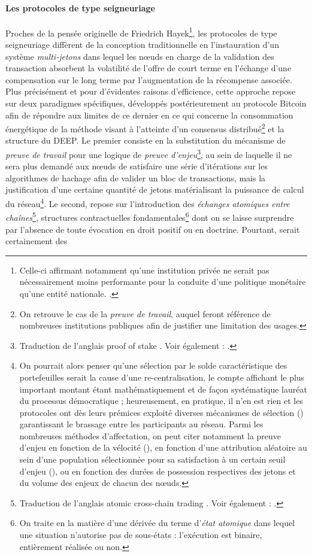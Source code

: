 {\paragraph{Les protocoles de type seigneuriage}

Proches de la pensée originelle de Friedrich Hayek\footnote{Celle-ci affirmant notamment qu'une institution privée ne serait pas nécessairement moins performante pour la conduite d'une politique monétaire qu'une entité nationale. .}, les protocoles de type seigneuriage diffèrent de la conception traditionnelle en l'instauration d'un système \emph{multi-jetons} dans lequel les n\oe{}uds en charge de la validation des transaction absorbent la volatilité de l'offre de court terme en l'échange d'une compensation sur le long terme par l'augmentation de la récompense associée. Plus précisément et pour d'évidentes raisons d'efficience, cette approche repose sur deux paradigmes spécifiques, développés postérieurement au protocole Bitcoin afin de répondre aux limites de ce dernier en ce qui concerne la consommation énergétique de la méthode visant à l'atteinte d'un consensus distribué\footnote{On retrouve le cas de la \emph{preuve de travail}, auquel feront référence de nombreuses institutions publiques afin de justifier une limitation des usages.} et la structure du DEEP. Le premier consiste en la substitution du mécanisme de \emph{preuve de travail} pour une logique de \emph{preuve d'enjeu}\footnote{Traduction de l'anglais \og proof of stake \fg{}. Voir également : .}, au sein de laquelle il ne sera plus demandé aux n\oe{}uds de satisfaire une série d'itérations sur les algorithmes de hachage afin de valider un bloc de transactions, mais la justification d'une certaine quantité de jetons matérialisant la puissance de calcul du réseau\footnote{On pourrait alors penser qu'une sélection par le solde caractéristique des portefeuilles serait la cause d'une re-centralisation, le compte affichant le plus important montant étant mathématiquement et de façon systématique lauréat du processus démocratique ; heureusement, en pratique, il n'en est rien et les protocoles ont dès leurs prémices exploité diverses mécanismes de sélection () garantissant le brassage entre les participants au réseau. Parmi les nombreuses méthodes d'affectation, on peut citer notamment la preuve d'enjeu en fonction de la vélocité (), en fonction d'une attribution aléatoire au sein d'une population sélectionnée pour sa satisfaction à un certain seuil d'enjeu (), ou en fonction des durées de possession respectives des jetons et du volume des enjeux de chacun des n\oe{}uds.}. Le second, repose sur l'introduction des \emph{échanges atomiques entre chaînes}\footnote{Traduction de l'anglais \og atomic cross-chain trading \fg{}. Voir également : .}, structures contractuelles fondamentales\footnote{On traite en la matière d'une dérivée du terme d'\emph{état atomique} dans lequel une situation n'autorise pas de sous-états : l'exécution est binaire, entièrement réalisée ou non.} dont on se laisse surprendre par l'absence de toute évocation en droit positif ou en doctrine. Pourtant, serait certainement des }
